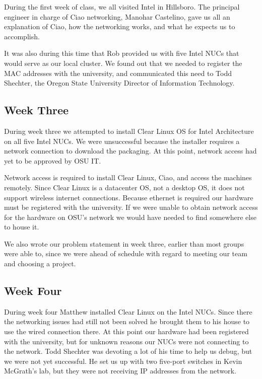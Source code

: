 \documentclass[10pt,onecolumn,journal,draftclsnofoot]{IEEEtran}
\begin{document}
During the first week of class, we all visited Intel in Hillsboro. The principal
engineer in charge of Ciao networking, Manohar Castelino, gave us all an
explanation of Ciao, how the networking works, and what he expects us to
accomplish.

It was also during this time that Rob provided us with five Intel NUCs that
would serve as our local cluster. We found out that we needed to register the
MAC addresses with the university, and communicated this need to Todd Shechter,
the Oregon State University Director of Information Technology.

\subsection{Week Three}

During week three we attempted to install Clear Linux OS for Intel
Architecture~\cite{clearlinux} on all five Intel NUCs. We were unsuccessful
because the installer requires a network connection to download the packaging.
At this point, network access had yet to be approved by OSU IT.

Network access is required to install Clear Linux, Ciao, and access the machines
remotely. Since Clear Linux is a datacenter OS, not a desktop OS, it does not
support wireless internet connections. Because ethernet is required our hardware
must be registered with the university. If we were unable to obtain network
access for the hardware on OSU's network we would have needed to find somewhere
else to house it.

We also wrote our problem statement in week three, earlier than most groups were
able to, since we were ahead of schedule with regard to meeting our team and
choosing a project.

\subsection{Week Four}

During week four Matthew installed Clear Linux on the Intel NUCs. Since there
the networking issues had still not been solved he brought them to his house to
use the wired connection there. At this point our hardware had been registered
with the university, but for unknown reasons our NUCs were not connecting to the
network. Todd Shechter was devoting a lot of his time to help us debug, but we
were not yet successful. He set us up with two five-port switches in Kevin
McGrath's lab, but they were not receiving IP addresses from the network.
\end{document}
